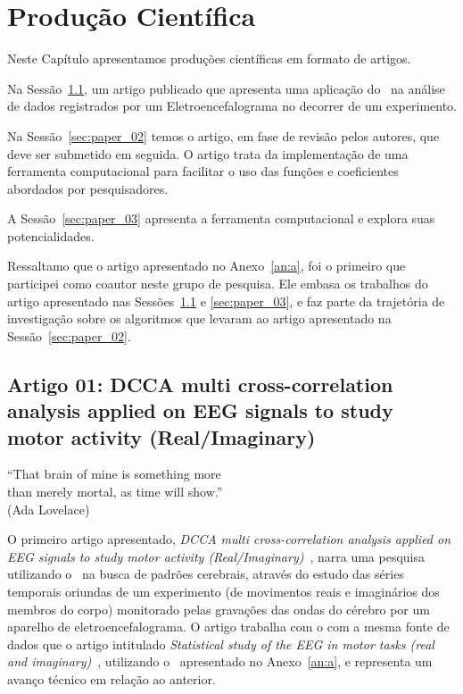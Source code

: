 \chapter{Produção Científica}
\label{cap:cap3}

Neste Capítulo apresentamos produções científicas em formato de artigos.

Na Sessão~\ref{sec:paper_01}, um artigo publicado que apresenta uma aplicação do \dmc~na análise de dados registrados por um Eletroencefalograma no decorrer de um experimento.

Na Sessão~\ref{sec:paper_02} temos o artigo, em fase de revisão pelos autores, que deve ser submetido em seguida. O artigo trata da implementação de uma ferramenta computacional para facilitar o uso das funções e coeficientes abordados por pesquisadores.

A Sessão~\ref{sec:paper_03} apresenta a ferramenta computacional e explora suas potencialidades.

Ressaltamo que o artigo apresentado no Anexo~\ref{an:a}, foi o primeiro que participei como coautor neste grupo de pesquisa. Ele embasa os trabalhos do artigo apresentado nas Sessões~\ref{sec:paper_01} e \ref{sec:paper_03}, e faz parte da trajetória de investigação sobre os algoritmos que levaram ao artigo apresentado na Sessão~\ref{sec:paper_02}.

\section{Artigo 01: DCCA multi cross-correlation analysis applied on EEG signals to study motor
activity (Real/Imaginary)}\label{sec:paper_01}

\begin{flushright}
    ``That brain of mine is something more\\
    than merely mortal, as time will show.''\\[10px]
    (Ada Lovelace)
\end{flushright}

O primeiro artigo apresentado, \emph{DCCA multi cross-correlation analysis applied on EEG signals to study motor activity (Real/Imaginary)}~\cite{RIBEIRO2025107419}, narra uma pesquisa utilizando o \dmc~na busca de padrões cerebrais, através do estudo das séries temporais oriundas de um experimento (de movimentos reais e imaginários dos membros do corpo) monitorado pelas gravações das ondas do cérebro por um aparelho de eletroencefalograma. O artigo trabalha com o \pdcca com a mesma fonte de dados que o artigo intitulado \emph{Statistical study of the EEG in motor tasks (real and imaginary)}~\cite{Oliveira2023}, utilizando o \pdcca~apresentado no Anexo~\ref{an:a}, e representa um avanço técnico em relação ao anterior.

